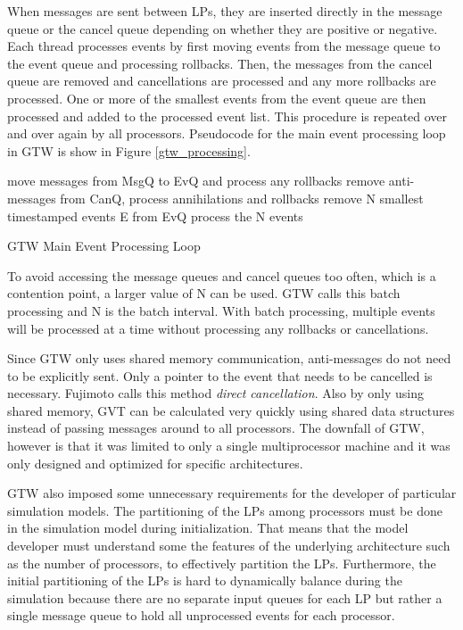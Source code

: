 \documentclass[11pt]{book}
\begin{document}
\noindent
When messages are sent between LPs, they are inserted directly in the message queue or the cancel
queue depending on whether they are positive or negative.  Each thread processes events by first
moving events from the message queue to the event queue and processing rollbacks.  Then, the
messages from the cancel queue are removed and cancellations are processed and any more rollbacks
are processed.  One or more of the smallest events from the event queue are then processed and added
to the processed event list.  This procedure is repeated over and over again by all processors.
Pseudocode for the main event processing loop in GTW is show in Figure \ref{gtw_processing}.

\begin{algorithm}
\DontPrintSemicolon
     {
        move messages from MsgQ to EvQ and process any rollbacks\;
        remove anti-messages from CanQ, process annihilations and rollbacks\;
        remove N smallest timestamped events E from EvQ\;
        process the N events\;
    }
\caption{GTW Main Event Processing Loop\cite{das-94,fujimoto-94}\label{gtw_processing}}
\end{algorithm}

\noindent
To avoid accessing the message queues and cancel queues too often, which is a contention point, a
larger value of N can be used.  GTW calls this batch processing and N is the batch interval.  With
batch processing, multiple events will be processed at a time without processing any rollbacks or
cancellations.

Since GTW only uses shared memory communication, anti-messages do not need to be
explicitly sent.  Only a pointer to the event that needs to be cancelled is necessary.
Fujimoto calls this method \emph{direct cancellation}.  Also by only using shared memory,
GVT can be calculated very quickly using shared data structures instead of passing
messages around to all processors.  The downfall of GTW, however is that it was limited to
only a single multiprocessor machine and it was only designed and optimized for specific
architectures.

GTW also imposed some unnecessary requirements for the developer of particular simulation models.
The partitioning of the LPs among processors must be done in the simulation model during
initialization.  That means that the model developer must understand some the features of the
underlying architecture such as the number of processors, to effectively partition the LPs.
Furthermore, the initial partitioning of the LPs is hard to dynamically balance during the
simulation because there are no separate input queues for each LP but rather a single message queue
to hold all unprocessed events for each processor.
\end{document}

